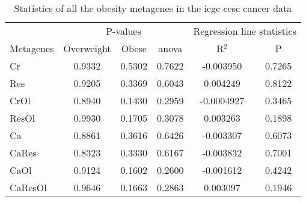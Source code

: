 \begin{appendices}
\begin{table}[htpb]
	\centering
	\caption[Statistics of all the obesity metagenes in the \gls{icgc} \acrshort{cesc} cancer data]{Statistics of all the obesity metagenes in the \gls{icgc} \gls{cesc} cancer data}
	\label{tab:degmetacesc}
	\begin{threeparttable}
		\begin{tabular}{lccccc}
			& \multicolumn{3}{c}{ P-values} & \multicolumn{2}{c}{ Regression line statistics}\\
			\cmidrule(r){2-4} \cmidrule(r){5-6}
			Metagenes &  Overweight &  Obese &  \gls{anova} &  R$^2$ &  P \\
			\hline
			\hline
			\rule{0pt}{2.25ex}Cr      & 0.9332                      & 0.5302  & 0.7622             & -0.003950  & 0.7265              \\
			Res     & 0.9205                      & 0.3369  & 0.6043             & 0.004249   & 0.8122              \\
			CrOl    & 0.8940                      & 0.1430  & 0.2959             & -0.0004927 & 0.3465              \\
			ResOl   & 0.9930                      & 0.1705  & 0.3078             & 0.003263   & 0.1898              \\
			Ca      & 0.8861                      & 0.3616  & 0.6426             & -0.003307  & 0.6073              \\
			CaRes   & 0.8323                      & 0.3330  & 0.6167             & -0.003832  & 0.7001              \\
			CaOl    & 0.9124                      & 0.1602  & 0.2600             & -0.001612  & 0.4242              \\
			CaResOl & 0.9646                      & 0.1663  & 0.2863             & 0.003097   & 0.1946              \\
			\hline
			\hline
		\end{tabular}
	\end{threeparttable}
\end{table}


\end{appendices}
